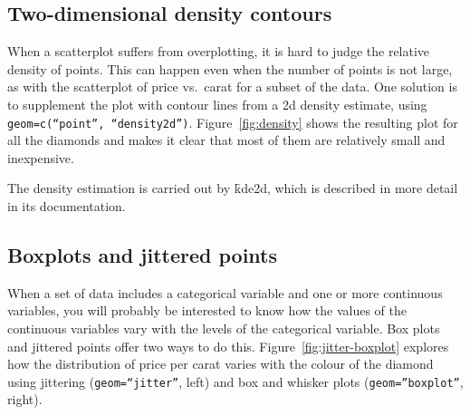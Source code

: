 \subsection{Two-dimensional density contours}
\label{sub:density2d}

When a scatterplot suffers from overplotting, it is hard to judge the relative density of points.  This can happen even when the number of points is not large, as with the scatterplot of price vs.\ carat for a subset of the data.  One solution is to supplement the plot with contour lines from a 2d density estimate, using {\tt geom=c(``point'', ``density2d'')}.  Figure~\ref{fig:density} shows the resulting plot for all the diamonds and makes it clear that most of them are relatively small and inexpensive.

% 


The density estimation is carried out by \f{kde2d}, which is described in more detail in its documentation.

\subsection{Boxplots and jittered points}
\label{sub:boxplot}

When a set of data includes a categorical variable and one or more continuous variables, you will probably be interested to know how the values of the continuous variables vary with the levels of the categorical variable.  Box plots and jittered points offer two ways to do this.  Figure~\ref{fig:jitter-boxplot} explores how the distribution of price per carat varies with the colour of the diamond using jittering ({\tt geom=``jitter''}, left) and box and whisker plots ({\tt geom=''boxplot''}, right).

% 


